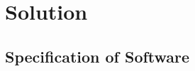 \documentclass[12pt,a4paper]{article}
\begin{document}















\section{Solution} 
\label{solutions}

\subsection{Specification of Software}
\end{document}
